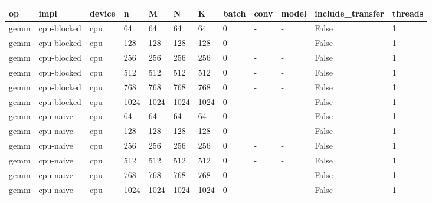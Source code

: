 \begin{tabular}{llllllllllll}
\hline
op & impl & device & n & M & N & K & batch & conv & model & include\_transfer & threads \\
\hline
gemm & cpu-blocked & cpu & 64 & 64 & 64 & 64 & 0 & - & - & False & 1 \\
gemm & cpu-blocked & cpu & 128 & 128 & 128 & 128 & 0 & - & - & False & 1 \\
gemm & cpu-blocked & cpu & 256 & 256 & 256 & 256 & 0 & - & - & False & 1 \\
gemm & cpu-blocked & cpu & 512 & 512 & 512 & 512 & 0 & - & - & False & 1 \\
gemm & cpu-blocked & cpu & 768 & 768 & 768 & 768 & 0 & - & - & False & 1 \\
gemm & cpu-blocked & cpu & 1024 & 1024 & 1024 & 1024 & 0 & - & - & False & 1 \\
gemm & cpu-naive & cpu & 64 & 64 & 64 & 64 & 0 & - & - & False & 1 \\
gemm & cpu-naive & cpu & 128 & 128 & 128 & 128 & 0 & - & - & False & 1 \\
gemm & cpu-naive & cpu & 256 & 256 & 256 & 256 & 0 & - & - & False & 1 \\
gemm & cpu-naive & cpu & 512 & 512 & 512 & 512 & 0 & - & - & False & 1 \\
gemm & cpu-naive & cpu & 768 & 768 & 768 & 768 & 0 & - & - & False & 1 \\
gemm & cpu-naive & cpu & 1024 & 1024 & 1024 & 1024 & 0 & - & - & False & 1 \\
\hline
\end{tabular}
